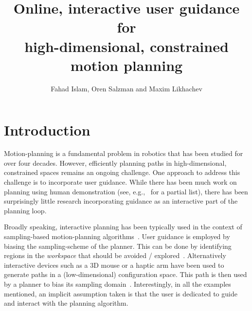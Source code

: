 \documentclass[conference]{IEEEtran}
\begin{document}
\title{	Online, interactive user guidance for \\
		high-dimensional, constrained motion planning }

\author{Fahad Islam, Oren Salzman and Maxim Likhachev}


\maketitle
\thispagestyle{empty}
\pagestyle{empty}



\begin{abstract}

\end{abstract}

\IEEEpeerreviewmaketitle

\section{Introduction}
\label{sec:intro}

Motion-planning is a fundamental problem in robotics that has been studied for over four decades. 
However, efficiently planning paths in high-dimensional, constrained spaces remains an ongoing challenge.
One approach to address this challenge is to incorporate user guidance.
While there has been much work on planning using human demonstration (see, e.g.,~\cite{HS16, PHCL16, SHLA16, YA17} for a partial list), there has been surprisingly little research incorporating guidance as an interactive part of the planning loop.

Broadly speaking, interactive planning has been typically used in the context of sampling-based motion-planning algorithms~\cite{L06}.
User guidance is employed by biasing the sampling-scheme of the planner.
This can be done by identifying regions in the \emph{workspace} that should be avoided / explored~\cite{DSJA14, MTMKDC15, YPB15}.
Alternatively interactive devices such as a 3D mouse or a haptic arm have been used to generate paths in a (low-dimensional) configuration space. This path is then used by a planner to bias its sampling domain~\cite{BTFF16, FTF09, TFF12}.
Interestingly, in all the examples mentioned, an implicit assumption taken is that the user is dedicated to guide and interact with the planning algorithm.
\end{document}
